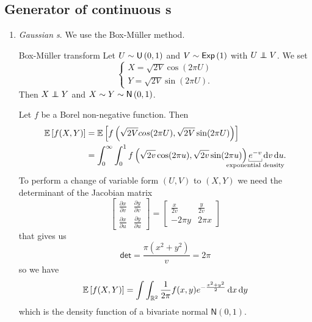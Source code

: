\documentclass[12pt]{report}
\begin{document}
\subsection{Generator of continuous \rv s}
\begin{enumerate}[\circnum]
	\item \emph{Gaussian \rv s}. We use the Box-Müller method. \begin{algobox}{Box-Müller transform}
		Let $U\sim\mathsf{U}\left(0,1\right)$ and $V\sim\mathsf{Exp}\left(1\right)$ with $U\independent V$. We set
	\begin{equation*}
		\begin{cases}
			X=\sqrt{2V}\cos(2\pi U)\\
			Y=\sqrt{2V}\sin(2\pi U).
		\end{cases}
	\end{equation*}
	Then $X\independent Y$ and $X\sim Y\sim\mathsf{N}\left(0,1\right)$.
	\end{algobox}
	\begin{fancyproof}
		Let $f$ be a Borel non-negative function. Then
		\begin{align*}
			\ev{f(X,Y)}&=\ev{f\left(\sqrt{2V}cos(2\pi U),\sqrt{2V}\sin(2\pi U)\right)}\\
			&=\int_{0}^{\infty}\int_{0}^{1}f\left(\sqrt{2v}\cos(2\pi u),\sqrt{2v}\sin(2\pi u)\right)\ubracketthin{e^{-v}}_{\claptext{exponential density}}\dif v\du.
		\end{align*}
		To perform a change of variable form $(U,V)$ to $(X,Y)$ we need the determinant of the Jacobian matrix
				\begin{equation*}
			\begin{bmatrix}
				\frac{\partial x}{\partial v}&\frac{\partial y}{\partial v}\\
				\frac{\partial x}{\partial u}&\frac{\partial y}{\partial u}
			\end{bmatrix}=\begin{bmatrix}
			\frac{x}{2v}&\frac{y}{2v}\\
			-2\pi y&2\pi x
			\end{bmatrix}
		\end{equation*}
		that gives us 
		\begin{equation*}
			\mathsf{det}=\frac{\pi(x^{2}+y^{2})}{v}=2\pi
		\end{equation*}
		so we have
		\begin{equation*}
				\mathbb{E}\left[f(X,Y)\right]=\int\int_{\mathbb{R}^{2}}\frac{1}{2\pi}f(x,y)e^{-\frac{x^{2}+y^{2}}{2}}\mathop{}\!\mathrm{d} x\mathop{}\!\mathrm{d} y
		\end{equation*}
		which is the density function of a bivariate normal $\mathsf{N}(0,1)$.

\end{fancyproof}
\end{enumerate}
\end{document}
